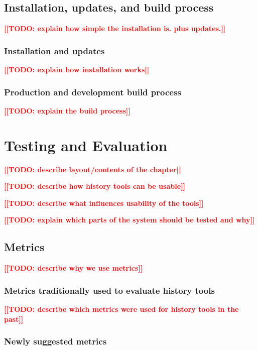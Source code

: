 \documentclass[thesis=M,english]{FITthesis}[2012/10/20]
\newcommand{\todotext}[1]{\textcolor{red}{\textbf{[[#1]]}}}
\newcommand{\blind}[1][1]{\textcolor{mygray}{\Blindtext[#1][1]}}
\begin{document}
\blind

\section{Installation, updates, and build process}

\todotext{TODO: explain how simple the installation is. plus updates.}

\blind

\subsection{Installation and updates}
\todotext{TODO: explain how installation works}

\blind

\subsection{Production and development build process}
\todotext{TODO: explain the build process}

\blind[2]


\chapter{Testing and Evaluation}

\todotext{TODO: describe layout/contents of the chapter}

\todotext{TODO: describe how history tools can be usable}

\todotext{TODO: describe what influences usability of the tools}

\todotext{TODO: explain which parts of the system should be tested and why}

\blind[3]

\section{Metrics}

\todotext{TODO: describe why we use metrics}

\subsection{Metrics traditionally used to evaluate history tools}

\todotext{TODO: describe which metrics were used for history tools in the past}

\subsection{Newly suggested metrics}
\end{document}
